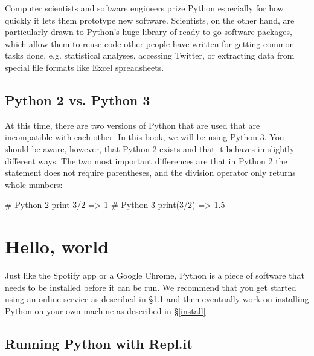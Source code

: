 \documentclass{article}
\let\oldsection\section
\renewcommand\section{\clearpage\oldsection}
\let\oldref\ref
\renewcommand\ref{\S\oldref}
\newcommand\pyi\pythoninline
\begin{document}
Computer scientists and software engineers prize Python especially for how quickly it lets them prototype new software. Scientists, on the other hand, are particularly drawn to Python's huge library of ready-to-go software packages, which allow them to reuse code other people have written for getting common tasks done, e.g. statistical analyses, accessing Twitter, or extracting data from special file formats like Excel spreadsheets.

\clearpage
\subsection{Python 2 vs. Python 3}
At this time, there are two versions of Python that are used that are incompatible with each other. In this book, we will be using Python 3. You should be aware, however, that Python 2 exists and that it behaves in slightly different ways. The two most important differences are that in Python 2 the \pyi{print} statement does not require parentheses, and the division operator only returns whole numbers:

\begin{python}
# Python 2
print 3/2
=> 1
# Python 3
print(3/2)
=> 1.5
\end{python}



\section{Hello, world}

Just like the Spotify app or a Google Chrome, Python is a piece of software that needs to be installed before it can be run. We recommend that you get started using an online service as described in \ref{sec:replit} and then eventually work on installing Python on your own machine as described in \ref{install}.

\subsection{Running Python with Repl.it}
\label{sec:replit}
\end{document}
